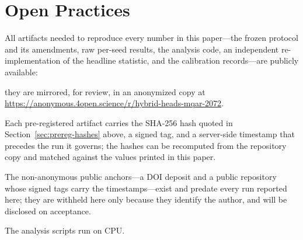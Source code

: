 \documentclass{article}
\newif\ifcameraready
\begin{document}
\section*{Open Practices}

All artifacts needed to reproduce every number in this paper---the frozen protocol and its
amendments, raw per-seed results, the analysis code, an independent re-implementation of the
headline statistic, and the calibration records---are publicly available:
\ifcameraready
\url{https://github.com/SperanzaMax/telar-ligamento}. The frozen protocol is additionally
deposited with a DOI (10.5281/zenodo.21495252).
\else
they are mirrored, for review, in an anonymized copy at
\url{https://anonymous.4open.science/r/hybrid-heads-mqar-2072}.
\fi
Each pre-registered artifact carries the SHA-256 hash quoted in Section~\ref{sec:prereg-hashes}
above, a signed tag, and a server-side timestamp that precedes the run it governs; the hashes
can be recomputed from the repository copy and matched against the values printed in this paper.
\ifcameraready
\else
The non-anonymous public anchors---a DOI deposit and a public repository whose signed tags carry
the timestamps---exist and predate every run reported here; they are withheld here only because
they identify the author, and will be disclosed on acceptance.
\fi
The analysis scripts run on CPU.

\ifcameraready
\subsubsection*{Acknowledgments}
This work was carried out independently, without institutional affiliation, supervision, or
funding. The author is an undergraduate student of the University Technical Degree in
Programming (\emph{Tecnicatura Universitaria en Programaci\'on}, TUP) at Universidad
Tecnol\'ogica Nacional (UTN), Argentina, and a graduate of its Diploma in Artificial
Intelligence; neither programme sponsored or supervised this study, which is reported here in a
personal capacity. The author declares no competing interests and received no funding.
ORCID iD: 0009-0005-0413-8554.
\fi



\end{document}
